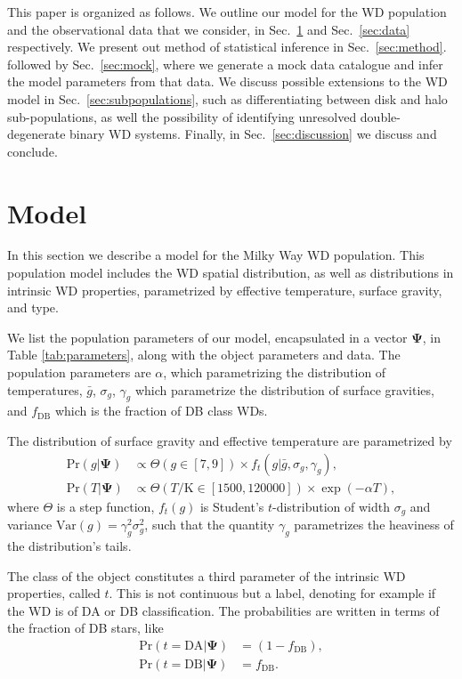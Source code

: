 \documentclass[fleqn,usenatbib]{mnras}
\newcommand{\popp}{\boldsymbol{\Psi}}
\newcommand{\Teff}{T}
\newcommand{\logg}{g}
\newcommand{\pr}{\text{Pr}}
\newcommand{\K}{\text{K}}
\begin{document}
This paper is organized as follows. We outline our model for the WD population and the observational data that we consider, in Sec.~\ref{sec:model} and Sec.~\ref{sec:data} respectively. We present out method of statistical inference in Sec.~\ref{sec:method}.  followed by Sec.~\ref{sec:mock}, where we generate a mock data catalogue and infer the model parameters from that data. We discuss possible extensions to the WD model in Sec.~\ref{sec:subpopulations}, such as differentiating between disk and halo sub-populations, as well the possibility of identifying unresolved double-degenerate binary WD systems. Finally, in Sec.~\ref{sec:discussion} we discuss and conclude.





\section{Model}\label{sec:model}

In this section we describe a model for the Milky Way WD population. This population model includes the WD spatial distribution, as well as distributions in intrinsic WD properties, parametrized by effective temperature, surface gravity, and type.

We list the population parameters of our model, encapsulated in a vector $\popp$, in Table \ref{tab:parameters}, along with the object parameters and data. The population parameters are $\alpha$, which parametrizing the distribution of temperatures, $\bar{g}$, $\sigma_g$, $\gamma_g$ which parametrize the distribution of surface gravities, and $f_\text{DB}$ which is the fraction of DB class WDs.

The distribution of surface gravity and effective temperature are parametrized by
\begin{equation}\label{eq:T&g}
\begin{split}
	\pr(\logg | \popp) & \propto \Theta(\logg \in [7,9]) \times f_t(\logg|\bar{g},\sigma_g,\gamma_g),\\
    \pr(\Teff | \popp) & \propto \Theta(\Teff/\K \in [1500,120000]) \times \exp (-\alpha \Teff),
\end{split}
\end{equation}
where $\Theta$ is a step function, $f_t(\logg)$ is Student's $t$-distribution of width $\sigma_g$ and variance $\text{Var}(g) = \gamma_g^2 \sigma_g^2$, such that the quantity $\gamma_g$ parametrizes the heaviness of the distribution's tails.

The class of the object constitutes a third parameter of the intrinsic WD properties, called $t$. This is not continuous but a label, denoting for example if the WD is of DA or DB classification. The probabilities are written in terms of the fraction of DB stars, like
\begin{equation}\label{eq:DADB}
\begin{split}
	\pr(t=\text{DA} | \popp) & = (1-f_\text{DB}),\\
    \pr(t=\text{DB} | \popp) & = f_\text{DB}.
\end{split}
\end{equation}
\end{document}
